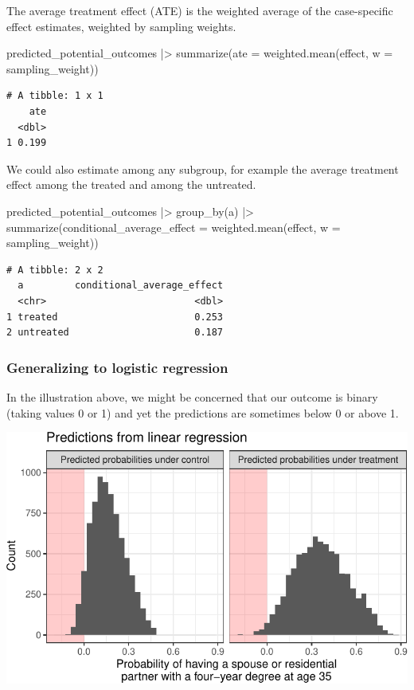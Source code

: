 \documentclass[
  letterpaper,
  DIV=11,
  numbers=noendperiod]{scrartcl}
\newenvironment{Shaded}{\begin{snugshade}}{\end{snugshade}}
\newcommand{\AttributeTok}[1]{\textcolor[rgb]{0.40,0.45,0.13}{#1}}
\newcommand{\FunctionTok}[1]{\textcolor[rgb]{0.28,0.35,0.67}{#1}}
\newcommand{\NormalTok}[1]{\textcolor[rgb]{0.00,0.23,0.31}{#1}}
\newcommand{\SpecialCharTok}[1]{\textcolor[rgb]{0.37,0.37,0.37}{#1}}
\begin{document}
The average treatment effect (ATE) is the weighted average of the
case-specific effect estimates, weighted by sampling weights.

\begin{Shaded}
\begin{Highlighting}[]
\NormalTok{predicted\_potential\_outcomes }\SpecialCharTok{|\textgreater{}}
  \FunctionTok{summarize}\NormalTok{(}\AttributeTok{ate =} \FunctionTok{weighted.mean}\NormalTok{(effect, }\AttributeTok{w =}\NormalTok{ sampling\_weight))}
\end{Highlighting}
\end{Shaded}

\begin{verbatim}
# A tibble: 1 x 1
    ate
  <dbl>
1 0.199
\end{verbatim}

We could also estimate among any subgroup, for example the average
treatment effect among the treated and among the untreated.

\begin{Shaded}
\begin{Highlighting}[]
\NormalTok{predicted\_potential\_outcomes }\SpecialCharTok{|\textgreater{}}
  \FunctionTok{group\_by}\NormalTok{(a) }\SpecialCharTok{|\textgreater{}}
  \FunctionTok{summarize}\NormalTok{(}\AttributeTok{conditional\_average\_effect =} \FunctionTok{weighted.mean}\NormalTok{(effect, }\AttributeTok{w =}\NormalTok{ sampling\_weight))}
\end{Highlighting}
\end{Shaded}

\begin{verbatim}
# A tibble: 2 x 2
  a         conditional_average_effect
  <chr>                          <dbl>
1 treated                        0.253
2 untreated                      0.187
\end{verbatim}

\subsubsection{Generalizing to logistic
regression}\label{generalizing-to-logistic-regression}

In the illustration above, we might be concerned that our outcome is
binary (taking values 0 or 1) and yet the predictions are sometimes
below 0 or above 1.

\includegraphics{models_for_causal_files/figure-pdf/unnamed-chunk-18-1.pdf}
\end{document}
